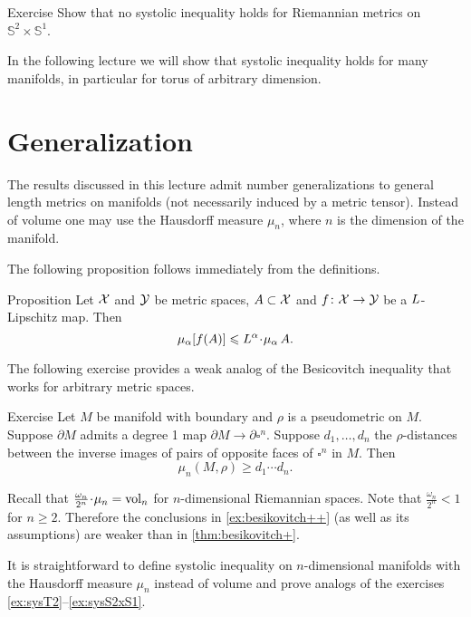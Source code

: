 \begin{thm}{Exercise}\label{ex:sysS2xS1}
Show that no systolic inequality holds for Riemannian metrics on $\mathbb{S}^2\times\mathbb{S}^1$.
\end{thm}

In the following lecture we will show that systolic inequality holds for many manifolds, in particular for torus of arbitrary dimension.

\section{Generalization}\label{sec:hausdorff-measure}

The results discussed in this lecture admit number generalizations to general length metrics on manifolds (not necessarily induced by a metric tensor).
Instead of volume one may use the Hausdorff measure $\mu_n$, where $n$ is the dimension of the manifold.

The following proposition follows immediately from the definitions.

\begin{thm}{Proposition}\label{prop:bilip-measure}
Let $\mathcal{X}$ and $\mathcal{Y}$ be metric spaces, $A\subset \mathcal{X}$
and
 $f\colon \mathcal{X}\to \mathcal{Y}$ be a $L$-Lipschitz map. 
Then 
\[\mu_\alpha [f(A)]\le \Lip^\alpha\cdot\mu_\alpha\, A.\]

\end{thm}

The following exercise provides a weak analog of the Besicovitch inequality that works for arbitrary metric spaces.

\begin{thm}{Exercise}\label{ex:besikovitch++}
Let $M$ be manifold with boundary and $\rho$ is a pseudometric on $M$.
Suppose $\partial M$ admits a degree 1 map $\partial M\to\partial\square^n$. 
Suppose $d_1,\dots, d_n$ the $\rho$-distances between the inverse images of pairs of opposite faces of $\square^n$ in $M$.
Then 
\[\mu_n(M,\rho)\ge d_1\cdots d_n.\]
\end{thm}


Recall that $\tfrac{\omega_n}{2^n}\cdot\mu_n=\vol_n$ for $n$-dimensional Riemannian spaces.
Note that $\tfrac{\omega_n}{2^n}<1$ for $n\ge 2$.
Therefore the conclusions in \ref{ex:besikovitch++} (as well as its assumptions) are weaker than in \ref{thm:besikovitch+}.

It is straightforward to define systolic inequality on $n$-dimensional manifolds with the Hausdorff measure $\mu_n$ instead of volume and prove analogs of the exercises \ref{ex:sysT2}--\ref{ex:sysS2xS1}.

